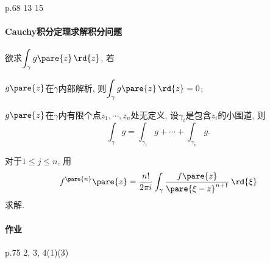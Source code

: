 \documentclass[../ComplexVariable.tex]{subfiles}
\begin{document}
p.68 13 15


\paragraph{Cauchy积分定理求解积分问题} %
\label{par:cauchy积分定理求解积分问题}

欲求$\displaystyle \int_\gamma g\pare{z}\,\rd{z}$, 若
\begin{cenum}
    \item $g\pare{z}$在$\gamma$内部解析, 则$\displaystyle \int_\gamma g\pare{z}\,\rd{z} = 0$;
    \item $g\pare{z}$在$\gamma$内有限个点$z_1,\cdots,z_n$处无定义, 设$\gamma_i$是包含$z_i$的小围道, 则
    \[ \int_\gamma g = \int_{\gamma_1} g + \cdots + \int_{\gamma_n} g. \]
    \item 对于$1\le j\le n$, 用
    \[ f^{\pare{n}}\pare{z} = \frac{n!}{2\pi i} \int_\gamma \frac{f\pare{z}}{\pare{\xi - z}^{n+1}}\,\rd{\xi} \]
    求解.
\end{cenum}
\paragraph{作业} %
\label{par:作业}

p.75 2, 3, 4(1)(3)

\end{document}
